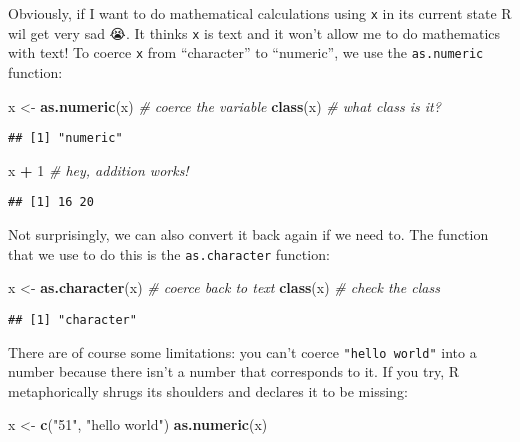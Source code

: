 \documentclass[]{book}
\newenvironment{Shaded}{\begin{snugshade}}{\end{snugshade}}
\newcommand{\CommentTok}[1]{\textcolor[rgb]{0.56,0.35,0.01}{\textit{#1}}}
\newcommand{\DecValTok}[1]{\textcolor[rgb]{0.00,0.00,0.81}{#1}}
\newcommand{\KeywordTok}[1]{\textcolor[rgb]{0.13,0.29,0.53}{\textbf{#1}}}
\newcommand{\NormalTok}[1]{#1}
\newcommand{\OperatorTok}[1]{\textcolor[rgb]{0.81,0.36,0.00}{\textbf{#1}}}
\newcommand{\StringTok}[1]{\textcolor[rgb]{0.31,0.60,0.02}{#1}}
\begin{document}
Obviously, if I want to do mathematical calculations using \texttt{x} in its current state R wil get very sad 😭. It thinks \texttt{x} is text and it won't allow me to do mathematics with text! To coerce \texttt{x} from ``character'' to ``numeric'', we use the \texttt{as.numeric} function:

\begin{Shaded}
\begin{Highlighting}[]
\NormalTok{x <-}\StringTok{ }\KeywordTok{as.numeric}\NormalTok{(x)  }\CommentTok{# coerce the variable}
\KeywordTok{class}\NormalTok{(x)            }\CommentTok{# what class is it?}
\end{Highlighting}
\end{Shaded}

\begin{verbatim}
## [1] "numeric"
\end{verbatim}

\begin{Shaded}
\begin{Highlighting}[]
\NormalTok{x }\OperatorTok{+}\StringTok{ }\DecValTok{1}               \CommentTok{# hey, addition works!}
\end{Highlighting}
\end{Shaded}

\begin{verbatim}
## [1] 16 20
\end{verbatim}

Not surprisingly, we can also convert it back again if we need to. The function that we use to do this is the \texttt{as.character} function:

\begin{Shaded}
\begin{Highlighting}[]
\NormalTok{x <-}\StringTok{ }\KeywordTok{as.character}\NormalTok{(x)   }\CommentTok{# coerce back to text}
\KeywordTok{class}\NormalTok{(x)               }\CommentTok{# check the class}
\end{Highlighting}
\end{Shaded}

\begin{verbatim}
## [1] "character"
\end{verbatim}

There are of course some limitations: you can't coerce \texttt{"hello\ world"} into a number because there isn't a number that corresponds to it. If you try, R metaphorically shrugs its shoulders and declares it to be missing:

\begin{Shaded}
\begin{Highlighting}[]
\NormalTok{x <-}\StringTok{ }\KeywordTok{c}\NormalTok{(}\StringTok{"51"}\NormalTok{, }\StringTok{"hello world"}\NormalTok{)}
\KeywordTok{as.numeric}\NormalTok{(x)}
\end{Highlighting}
\end{Shaded}
\end{document}
